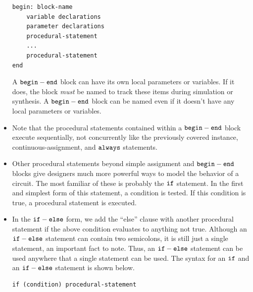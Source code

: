\documentclass[10pt,a4paper]{article}
\begin{document}
\begin{itemize}
\begin{lstlisting}
begin: block-name
	variable declarations
	parameter declarations
	procedural-statement
	...
	procedural-statement
end
\end{lstlisting}
A $\tt{begin-end}$ block can have its own local parameters or variables. If it does, the block \textit{must} be named to track these items during simulation or synthesis. A $\tt{begin-end}$ block can be named even if it doesn't have any local parameters or variables. 
\item Note that the procedural statements contained within a $\tt{begin-end}$ block execute sequentially, not concurrently like the previously covered instance, continuous-assignment, and $\tt{always}$ statements. 
\item Other procedural statements beyond simple assignment and $\tt{begin-end}$ blocks give designers much more powerful ways to model the behavior of a circuit. The most familiar of these is probably the $\tt{if}$ statement. In the first and simplest form of this statement, a condition is tested. If this condition is true, a procedural statement is executed.
\item In the $\tt{if-else}$ form, we add the ``else'' clause with another procedural statement if the above condition evaluates to anything not true. Although an $\tt{if-else}$ statement can contain two semicolons, it is still just a single statement, an important fact to note. Thus, an $\tt{if-else}$ statement can be used anywhere that a single statement can be used. The syntax for an $\tt{if}$ and an $\tt{if-else}$ statement is shown below.
\begin{lstlisting}
if (condition) procedural-statement


\end{lstlisting}
\end{itemize}
\end{document}
